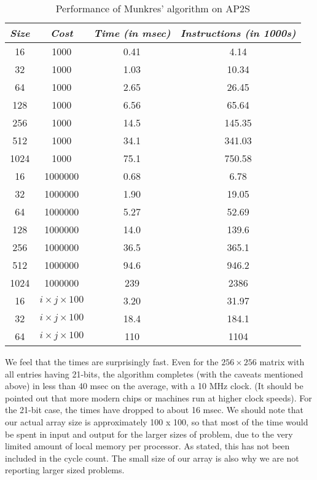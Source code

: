 \begin{table}
\begin{center}
\begin{tabular}{|c|c|c|c|} \hline \hline
{\em Size }	& {\em Cost } 	& {\em Time (in msec)} & {\em Instructions (in 1000s)} \\ \hline
16	&	1000	&   0.41  	&     4.14  \\ \hline
32	&	1000	&   1.03  	&    10.34  \\ \hline
64	&	1000	&   2.65  	&    26.45  \\ \hline
128	&	1000	&   6.56  	&    65.64  \\ \hline
256	&	1000	&   14.5  	&   145.35  \\ \hline
512	&	1000	&   34.1  	&   341.03  \\ \hline
1024	&	1000	&   75.1  	&   750.58  \\ \hline \hline
16	&    1000000	&   0.68  	&     6.78  \\ \hline
32	&    1000000	&   1.90  	&    19.05  \\ \hline
64	&    1000000	&   5.27  	&    52.69  \\ \hline
128	&    1000000	&   14.0  	&   139.6  \\ \hline
256	&    1000000	&   36.5  	&   365.1  \\ \hline
512	&    1000000	&   94.6  	&   946.2  \\ \hline
1024	&    1000000	&    239  	&  2386  \\ \hline \hline
16	& $i \times j \times 100$ & 3.20	&  31.97  \\ \hline
32	& $i \times j \times 100$ & 18.4	& 184.1   \\ \hline
64	& $i \times j \times 100$ & 110		& 1104    \\ \hline
\end{tabular}
\end{center}
\caption{Performance of Munkres' algorithm on AP2S}
\label{fig_1_munkres_results}
\end{table}

We feel that the times are surprisingly fast.  Even for the $256 \times 256$ 
matrix with all entries having 21-bits, the algorithm completes 
(with the caveats mentioned above) in less than 40 msec on the 
average, with a 10 MHz clock.  
(It should be pointed out that more modern chips or machines run at 
higher clock speeds).  For the 21-bit case, the times have dropped to 
about 16 msec.  We should note that our actual array size is 
approximately 100 x 100, so that most of the time would be spent in 
input and output for the larger sizes of problem, due to the very 
limited amount of local memory per processor.  As stated, this has not 
been included in the cycle count.  The small size of our array is also 
why we are not reporting larger sized problems.


